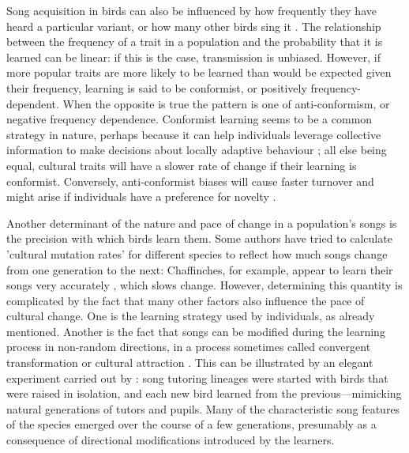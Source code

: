 Song acquisition in birds can also be influenced by how frequently they have heard a particular variant, or how many other birds sing it \autocite{aplin2015c,vanleeuwen2015}. The relationship between the frequency of a trait in a population and the probability that it is learned can be linear: if this is the case, transmission is unbiased. However, if more popular traits are more likely to be learned than would be expected given their frequency, learning is said to be conformist, or positively frequency-dependent. When the opposite is true the pattern is one of anti-conformism, or negative frequency dependence. Conformist learning seems to be a common strategy in nature, perhaps because it can help individuals leverage collective information to make decisions about locally adaptive behaviour \autocite{danchin2018,pike2010,whiten2019}; all else being equal, cultural traits will have a slower rate of change if their learning is conformist. Conversely, anti-conformist biases will cause faster turnover \autocite{acerbi2014} and might arise if individuals have a preference for novelty \autocite{Smaldino2015}.

Another determinant of the nature and pace of change in a population’s songs is the precision with which birds learn them. Some authors have tried to calculate 'cultural mutation rates’ for different species to reflect how much songs change from one generation to the next: Chaffinches, for example, appear to learn their songs very accurately \autocite{lachlan2003a,Slater1986}, which slows change. However, determining this quantity is complicated by the fact that many other factors also influence the pace of cultural change. One is the learning strategy used by individuals, as already mentioned. Another is the fact that songs can be modified during the learning process in non-random directions, in a process sometimes called convergent transformation or cultural attraction \autocite{claidiere2018,gray2007,heyes1993,morin2016}. This can be illustrated by an elegant experiment carried out by \textcite{feher2009}: song tutoring lineages were started with birds that were raised in isolation, and each new bird learned from the previous---mimicking natural generations of tutors and pupils. Many of the characteristic song features of the species emerged over the course of a few generations, presumably as a consequence of directional modifications introduced by the learners.

